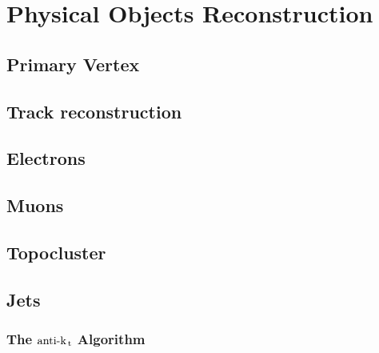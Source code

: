 \documentclass[10pt,twoside,cucitura,classica,english,openany]{toptesi}
\begin{document}


\chapter{Physical Objects Reconstruction}
\label{cha:phys-objects-reconst}



\section{Primary Vertex}
\label{sec:primary-vertex}



\section{Track reconstruction}
\label{sec:track-reconstruction}



\section{Electrons}
\label{sec:electrons}



\section{Muons}
\label{sec:muons}



\section{Topocluster}
\label{sec:topocluster}



\section{Jets}
\label{sec:jets}



\subsection{The \emph{$\text{anti-k}_\mathrm{\, t}$} Algorithm}
\label{sec:anti-k_t}
\end{document}
